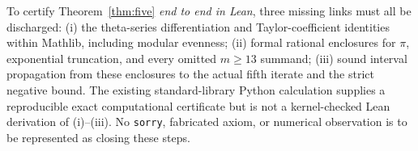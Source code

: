 To certify Theorem~\ref{thm:five} \emph{end to end in Lean},
three missing links must all be discharged:
(i) the theta-series differentiation and Taylor-coefficient
identities within Mathlib, including modular evenness;
(ii) formal rational enclosures for $\pi$, exponential
truncation, and every omitted $m\ge13$ summand;
(iii) sound interval propagation from these enclosures
to the actual fifth iterate and the strict negative bound.
The existing standard-library Python calculation supplies
a reproducible exact computational certificate but is not
a kernel-checked Lean derivation of (i)--(iii).
No \texttt{sorry}, fabricated axiom, or numerical
observation is to be represented as closing these steps.

